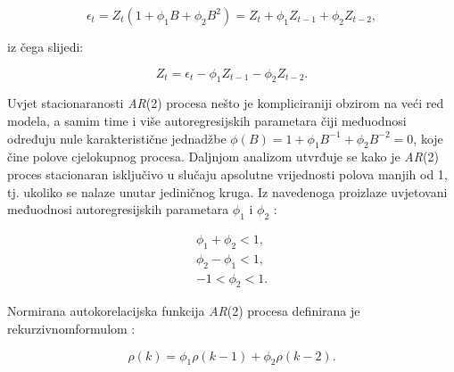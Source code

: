 \documentclass[a4paper,12pt,oneside]{memoir}
\begin{document}
                \begin{equation}
                    \epsilon_t=Z_t(1+\phi_1B+\phi_2B^2)=Z_t+\phi_1Z_{t-1}+\phi_2Z_{t-2},
                \end{equation}

                iz čega slijedi:

                \begin{equation}
                    Z_t=\epsilon_t-\phi_1Z_{t-1}-\phi_2Z_{t-2}.
                \end{equation}

                Uvjet stacionaranosti \textit{AR}(2) procesa nešto je kompliciraniji obzirom na veći red modela, a samim time i više autoregresijskih parametara čiji međuodnosi određuju nule karakteristične jednadžbe $\phi(B)=1+\phi_1B^{-1}+\phi_2B^{-2}=0$, koje čine polove cjelokupnog procesa. Daljnjom analizom utvrđuje se kako je \textit{AR}(2) proces stacionaran isključivo u slučaju apsolutne vrijednosti polova manjih od 1, tj. ukoliko se nalaze unutar jediničnog kruga. Iz navedenoga proizlaze uvjetovani međuodnosi autoregresijskih parametara $\phi_1$ i $\phi_2$ \cite{Bahovec}:

                \begin{align*}
                    \phi_1 + \phi_2 < 1,\\
                    \phi_2 - \phi_1 < 1,\\
                    -1<\phi_2<1.
                \end{align*}

                Normirana autokorelacijska funkcija \textit{AR}(2) procesa definirana je rekurzivnom\footnotemark[7] formulom \cite{Bahovec}:

                \begin{equation}
                    \rho(k)=\phi_1\rho(k-1)+\phi_2\rho(k-2).
                \end{equation}


                
\end{document}
